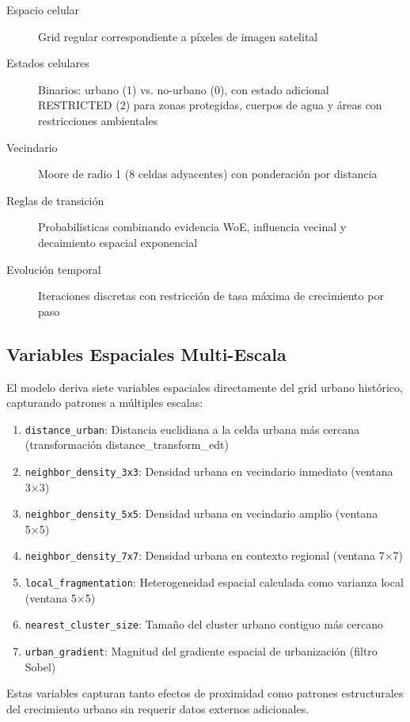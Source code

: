 \begin{description}
\item[Espacio celular] Grid regular correspondiente a píxeles de imagen satelital
\item[Estados celulares] Binarios: urbano (1) vs. no-urbano (0), con estado adicional RESTRICTED (2) para zonas protegidas, cuerpos de agua y áreas con restricciones ambientales
\item[Vecindario] Moore de radio 1 (8 celdas adyacentes) con ponderación por distancia
\item[Reglas de transición] Probabilísticas combinando evidencia WoE, influencia vecinal y decaimiento espacial exponencial
\item[Evolución temporal] Iteraciones discretas con restricción de tasa máxima de crecimiento por paso
\end{description}

\subsection{Variables Espaciales Multi-Escala}

El modelo deriva siete variables espaciales directamente del grid urbano histórico, capturando patrones a múltiples escalas:

\begin{enumerate}
\item \texttt{distance\_urban}: Distancia euclidiana a la celda urbana más cercana (transformación distance\_transform\_edt)
\item \texttt{neighbor\_density\_3x3}: Densidad urbana en vecindario inmediato (ventana 3×3)
\item \texttt{neighbor\_density\_5x5}: Densidad urbana en vecindario amplio (ventana 5×5)  
\item \texttt{neighbor\_density\_7x7}: Densidad urbana en contexto regional (ventana 7×7)
\item \texttt{local\_fragmentation}: Heterogeneidad espacial calculada como varianza local (ventana 5×5)
\item \texttt{nearest\_cluster\_size}: Tamaño del cluster urbano contiguo más cercano
\item \texttt{urban\_gradient}: Magnitud del gradiente espacial de urbanización (filtro Sobel)
\end{enumerate}

Estas variables capturan tanto efectos de proximidad como patrones estructurales del crecimiento urbano sin requerir datos externos adicionales.

